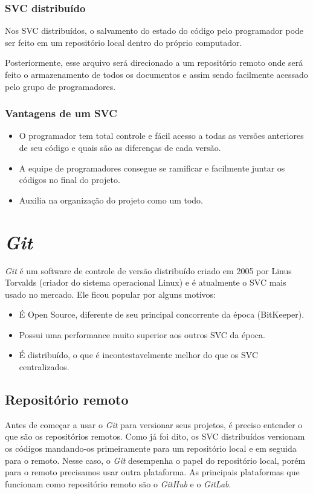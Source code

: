 \documentclass{article}
\begin{document}
\subsubsection{SVC distribuído}
\hspace{4mm}Nos SVC distribuídos, o salvamento do estado do código pelo programador pode ser feito em um repositório local dentro do próprio computador.

Posteriormente, esse arquivo será direcionado a um repositório remoto onde será feito o armazenamento de todos os documentos e assim sendo facilmente acessado pelo grupo de programadores.

\subsubsection{Vantagens de um SVC}
\begin{itemize}
    \item O programador tem total controle e fácil acesso a todas as versões anteriores de seu código e quais são as diferenças de cada versão.
    \item A equipe de programadores consegue se ramificar e facilmente juntar os códigos no final do projeto.
    \item Auxilia na organização do projeto como um todo.
\end{itemize}

\section{\textit{Git}}
\hspace{4mm}\textit{Git} é um software de controle de versão distribuído criado em 2005 por Linus Torvalds (criador do sistema operacional Linux) e é atualmente o SVC mais usado no mercado. Ele ficou popular por alguns motivos:
\begin{itemize}
    \item É Open Source, diferente de seu principal concorrente da época (BitKeeper). 
    \item Possui uma performance muito superior aos outros SVC da época.
    \item É distribuído, o que é incontestavelmente melhor do que os SVC centralizados.
\end{itemize}
\subsection{Repositório remoto}
\hspace{4mm}Antes de começar a usar o \textit{Git} para versionar seus projetos, é preciso entender o que são os repositórios remotos. Como já foi dito, os SVC distribuídos versionam os códigos mandando-os primeiramente para um repositório local e em seguida para o remoto. Nesse caso, o \textit{Git} desempenha o papel do repositório local, porém para o remoto precisamos usar outra plataforma. As principais plataformas que funcionam como repositório remoto são o \textit{GitHub} e o \textit{GitLab}.
\end{document}
